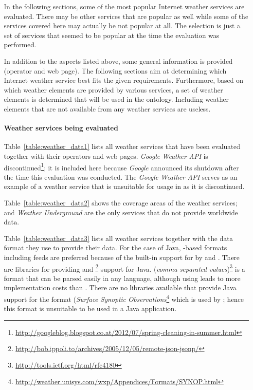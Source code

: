 In the following sections, some of the most popular Internet weather services are evaluated. There may be other services that are popular as well while some of the services covered here may actually be not popular at all. The selection is just a set of services that seemed to be popular at the time the evaluation was performed.

In addition to the aspects listed above, some general information is provided (operator and web page). The following sections aim at determining which Internet weather service best fits the given requirements. Furthermore, based on which weather elements are provided by various services, a set of weather elements is determined that will be used in the ontology. Including weather elements that are not available from any weather services are useless.

\paragraph{Weather services being evaluated}

Table~\ref{table:weather_data1} lists all weather services that have been evaluated together with their operators and web pages. \emph{Google Weather API} is discontinued\footnote{\href{http://googleblog.blogspot.co.at/2012/07/spring-cleaning-in-summer.html}{http://googleblog.blogspot.co.at/2012/07/spring-cleaning-in-summer.html}}; it is included here because \emph{Google} announced its shutdown after the time this evaluation was conducted. The \emph{Google Weather API} serves as an example of a weather service that is unsuitable for usage in \thinkhomeweather as it is discontinued.

Table~\ref{table:weather_data2} shows the coverage areas of the weather services;  and \emph{Weather Underground} are the only services that do not provide worldwide data.

Table~\ref{table:weather_data3} lists all weather services together with the data format they use to provide their data. For the case of Java, -based formats including  feeds are preferred because of the built-in support for  by  and . There are libraries for providing  and \footnote{\href{http://bob.ippoli.to/archives/2005/12/05/remote-json-jsonp/}{http://bob.ippoli.to/archives/2005/12/05/remote-json-jsonp/}} support for Java.  (\emph{comma-separated values})\footnote{\href{http://tools.ietf.org/html/rfc4180}{http://tools.ietf.org/html/rfc4180}} is a format that can be parsed easily in any language, although using  leads to more implementation costs than . There are no libraries available that provide Java support for the  format (\emph{Surface Synoptic Observations}\footnote{\href{http://weather.unisys.com/wxp/Appendices/Formats/SYNOP.html}{http://weather.unisys.com/wxp/Appendices/Formats/SYNOP.html}} which is used by ; hence this format is unsuitable to be used in a Java application.


